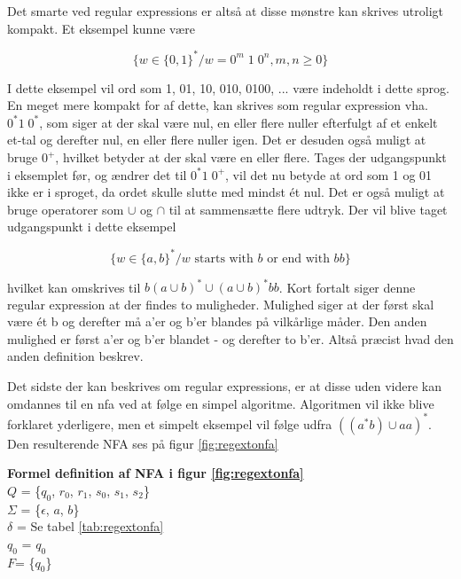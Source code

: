 Det smarte ved regular expressions er altså at disse mønstre kan skrives utroligt kompakt. Et eksempel kunne være 

$$ \{w \in \{0, 1\}^* / w = 0^m\; 1\; 0^n, m,n \geq 0\} $$

\noindent I dette eksempel vil ord som 1, 01, 10, 010, 0100, ... være indeholdt i dette sprog. En meget mere kompakt for af dette, kan skrives som regular expression vha. $ 0^* 1\; 0^* $, som siger at der skal være nul, en eller flere nuller efterfulgt af et enkelt et-tal og derefter nul, en eller flere nuller igen. Det er desuden også muligt at bruge $0^+$, hvilket betyder at der skal være en eller flere. Tages der udgangspunkt i eksemplet før, og ændrer det til $0^* 1\; 0^+$, vil det nu betyde at ord som 1 og 01 ikke er i sproget, da ordet skulle slutte med mindst ét nul. Det er også muligt at bruge operatorer som $\cup$ og $\cap$ til at sammensætte flere udtryk. Der vil blive taget udgangspunkt i dette eksempel

$$ \{w \in \{a, b\}^* / w \text{ starts with }b \text{ or end with }bb\} $$

\noindent hvilket kan omskrives til $b(a \cup b)^* \cup (a \cup b)^* bb$. Kort fortalt siger denne regular expression at der findes to muligheder. Mulighed siger at der først skal være ét b og derefter må a'er og b'er blandes på vilkårlige måder. Den anden mulighed er først a'er og b'er blandet - og derefter to b'er. Altså præcist hvad den anden definition beskrev.

Det sidste der kan beskrives om regular expressions, er at disse uden videre kan omdannes til en \gls{nfa} ved at følge en simpel algoritme. Algoritmen vil ikke blive forklaret yderligere, men et simpelt eksempel vil følge udfra $((a^*b) \cup aa)^*$. Den resulterende NFA ses på figur \ref{fig:regextonfa}


\noindent \textbf{Formel definition af NFA i figur \ref{fig:regextonfa}}\\
\noindent $Q$ = \{$q_0$, $r_0$, $r_1$, $s_0$, $s_1$, $s_2$\}\\
\noindent $\Sigma$ = \{$\epsilon$, $a$, $b$\}\\
\noindent $\delta$ = Se tabel \ref{tab:regextonfa}\\
\noindent $q_0$ = $q_0$\\
\noindent $F$= \{$q_0$\}\\

